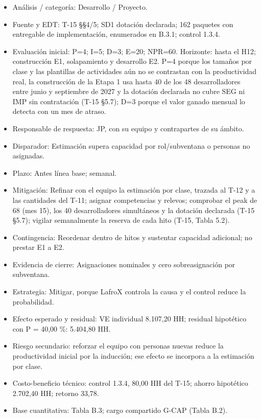 \begin{itemize}[leftmargin=*,itemsep=3pt]
\item Análisis / categoría: Desarrollo / Proyecto.
\item Fuente y EDT: T-15 §§4/5; SD1 dotación declarada; 162 paquetes con entregable de implementación, enumerados en B.3.1; control 1.3.4.
\item Evaluación inicial: P=4; I=5; D=3; E=20; NPR=60. Horizonte: hasta el H12; construcción E1, solapamiento y desarrollo E2. P=4 porque los tamaños por clase y las plantillas de actividades aún no se contrastan con la productividad real, la construcción de la Etapa 1 usa hasta 40 de los 48 desarrolladores entre junio y septiembre de 2027 y la dotación declarada no cubre SEG ni IMP sin contratación (T-15 §5.7); D=3 porque el valor ganado mensual lo detecta con un mes de atraso.
\item Responsable de respuesta: JP, con su equipo y contrapartes de su ámbito.
\item Disparador: Estimación supera capacidad por rol/subventana o personas no asignadas.
\item Plazo: Antes línea base; semanal.
\item Mitigación: Refinar con el equipo la estimación por clase, trazada al T-12 y a las cantidades del T-11; asignar competencias y relevos; comprobar el peak de 68 (mes 15), los 40 desarrolladores simultáneos y la dotación declarada (T-15 §5.7); vigilar semanalmente la reserva de cada hito (T-15, Tabla 5.2).
\item Contingencia: Reordenar dentro de hitos y sustentar capacidad adicional; no prestar E1 a E2.
\item Evidencia de cierre: Asignaciones nominales y cero sobreasignación por subventana.
\item Estrategia: Mitigar, porque LafroX controla la causa y el control reduce la probabilidad.
\item Efecto esperado y residual: VE individual 8.107,20 HH; residual hipotético con P = 40,00 \%: 5.404,80 HH.
\item Riesgo secundario: reforzar el equipo con personas nuevas reduce la productividad inicial por la inducción; ese efecto se incorpora a la estimación por clase.
\item Costo-beneficio técnico: control 1.3.4, 80,00 HH del T-15; ahorro hipotético 2.702,40 HH; retorno 33,78.
\item Base cuantitativa: Tabla B.3; cargo compartido G-CAP (Tabla B.2).
\end{itemize}

